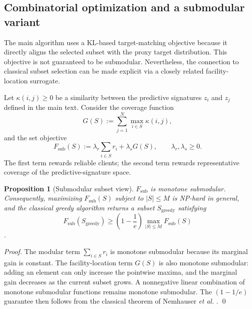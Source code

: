 \documentclass[conference]{IEEEtran}
\newtheorem{proposition}{Proposition}
\theoremstyle{definition}
\theoremstyle{remark}
\begin{document}
\subsection{Combinatorial optimization and a submodular variant}
\label{app:submodular_variant}

The main algorithm uses a KL-based target-matching objective because it directly aligns the selected subset with the proxy target distribution. This objective is not guaranteed to be submodular. Nevertheless, the connection to classical subset selection can be made explicit via a closely related facility-location surrogate.

Let $\kappa(i,j)\ge 0$ be a similarity between the predictive signatures $z_i$ and $z_j$ defined in the main text. Consider the coverage function
\begin{equation}
G(S) := \sum_{j=1}^N \max_{i\in S} \kappa(i,j),
\end{equation}
and the set objective
\begin{equation}
F_{\mathrm{sub}}(S)
:=
\lambda_r\sum_{i\in S} r_i
+ \lambda_s G(S),
\qquad \lambda_r,\lambda_s\ge 0.
\end{equation}
The first term rewards reliable clients; the second term rewards representative coverage of the predictive-signature space.

\begin{proposition}[Submodular subset view]
\label{prop:submodular_appendix}
$F_{\mathrm{sub}}$ is monotone submodular. Consequently, maximizing $F_{\mathrm{sub}}(S)$ subject to $|S|\le M$ is NP-hard in general, and the classical greedy algorithm returns a subset $S_{\mathrm{greedy}}$ satisfying
\begin{equation}
F_{\mathrm{sub}}(S_{\mathrm{greedy}})
\ge
\left(1-\frac{1}{e}\right)
\max_{|S|\le M}F_{\mathrm{sub}}(S)
\end{equation}
\cite{nemhauser1978submodular,krause2014submodular}.
\end{proposition}

\begin{proof}
The modular term $\sum_{i\in S}r_i$ is monotone submodular because its marginal gain is constant. The facility-location term $G(S)$ is also monotone submodular: adding an element can only increase the pointwise maxima, and the marginal gain decreases as the current subset grows. A nonnegative linear combination of monotone submodular functions remains monotone submodular. The $(1-1/e)$ guarantee then follows from the classical theorem of Nemhauser \emph{et al.} \cite{nemhauser1978submodular}. \qed
\end{proof}
\end{document}
